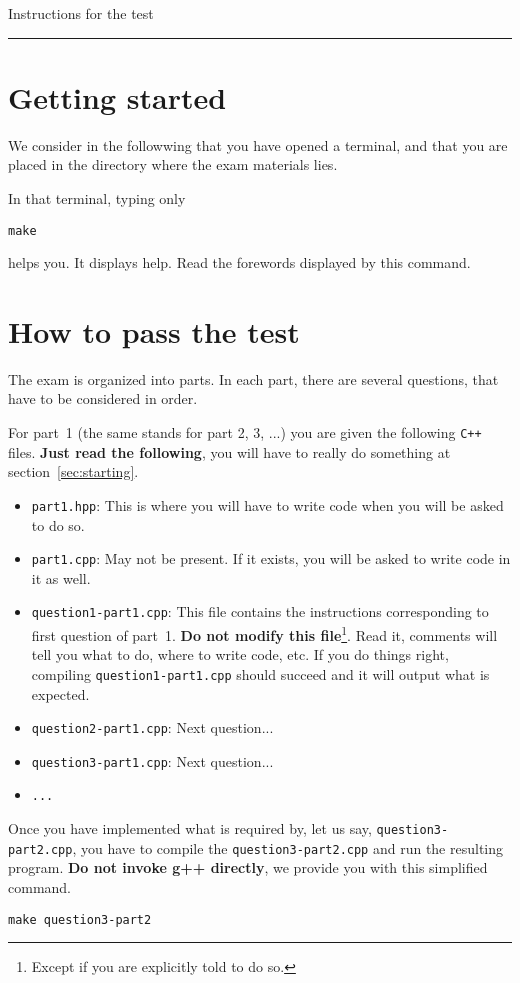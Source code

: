 \documentclass[a4paper,10pt]{article}
\begin{document}
\centerline{\Large \sc Instructions for the test}
\vspace{5mm}
\hrule
\vspace{5mm}
\tableofcontents

\section{Getting started}

We consider in the followwing that you have opened a terminal, and that you are placed in the directory where the exam materials lies.

In that terminal, typing only
\begin{verbatim}make
\end{verbatim}
helps you. It displays help. Read the forewords displayed by this command.

\section{How to pass the test}

The exam is organized into parts. In each part, there are several questions, that have to be considered in order.

For part~1 (the same stands for part 2, 3, ...) you are given the following {\tt C++} files. {\bf Just read the following}, you will have to really do something at section~\ref{sec:starting}.
\begin{itemize}
  \item {\tt part1.hpp}: This is where you will have to write code when you will be asked to do so.
  \item {\tt part1.cpp}: May not be present. If it exists, you will be asked to write code in it as well.
  \item {\tt question1-part1.cpp}: This file contains the instructions corresponding to first question of part~1. {\bf Do not modify this file}\footnote{Except if you are explicitly told to do so.}. Read it, comments will tell you what to do, where to write code, etc. If you do things right, compiling {\tt question1-part1.cpp} should succeed and it will output what is expected.
  \item {\tt question2-part1.cpp}: Next question...
  \item {\tt question3-part1.cpp}: Next question...
  \item {\tt ...}
\end{itemize}

Once you have implemented what is required by, let us say, {\tt question3-part2.cpp}, you have to compile the {\tt question3-part2.cpp} and run the resulting program. {\bf Do not invoke g++ directly}, we provide you with this simplified command.
\begin{verbatim}make question3-part2
\end{verbatim}
\end{document}

